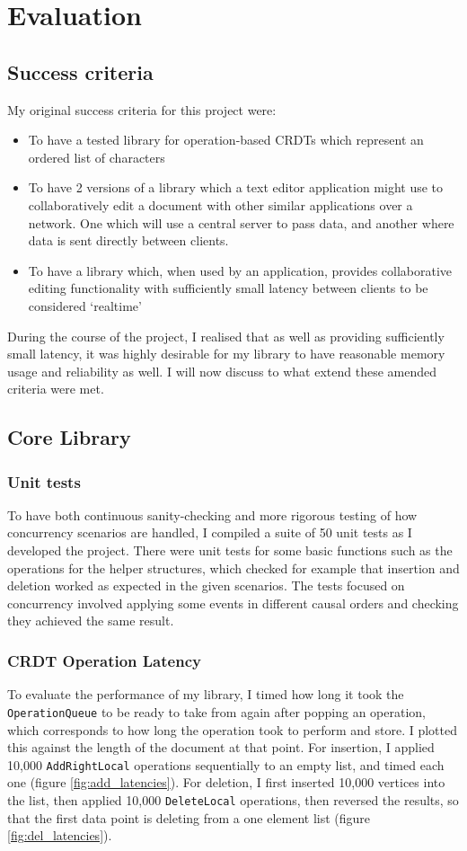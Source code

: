 \documentclass[diss.tex]{subfiles}
\begin{document}
\chapter{Evaluation}
\label{chap:evaluation}
\section{Success criteria}
My original success criteria for this project were:
\begin{itemize}
	\item To have a tested library for operation-based CRDTs which represent an ordered list of characters
	\item To have 2 versions of a library which a text editor application might use to collaboratively edit a document with other similar applications over a network. One which will use a central server to pass data, and another where data is sent directly between clients.
	\item To have a library which, when used by an application, provides collaborative editing functionality with sufficiently small latency between clients to be considered `realtime'
\end{itemize}

During the course of the project, I realised that as well as providing sufficiently small latency, it was highly desirable for my library to have reasonable memory usage and reliability as well. I will now discuss to what extend these amended criteria were met.
\section{Core Library}
\subsection{Unit tests}
To have both continuous sanity-checking and more rigorous testing of how concurrency scenarios are handled, I compiled a suite of 50 unit tests as I developed the project. There were unit tests for some basic functions such as the operations for the helper structures, which checked for example that insertion and deletion worked as expected in the given scenarios. The tests focused on concurrency involved applying some events in different causal orders and checking they achieved the same result.
\subsection{CRDT Operation Latency}
To evaluate the performance of my library, I timed how long it took the \texttt{OperationQueue} to be ready to take from again after popping an operation, which corresponds to how long the operation took to perform and store. I plotted this against the length of the document at that point. For insertion, I applied 10,000 \texttt{AddRightLocal} operations sequentially to an empty list, and timed each one (figure \ref{fig:add_latencies}). For deletion, I first inserted 10,000 vertices into the list, then applied 10,000 \texttt{DeleteLocal} operations, then reversed the results, so that the first data point is deleting from a one element list (figure \ref{fig:del_latencies}).
\end{document}
